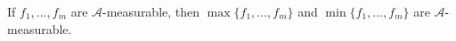 If $f_1, \ldots, f_m$ are $\mathcal{A}$-measurable, then $\max\{f_1, \ldots, f_m\}$ and $\min\{f_1, \ldots, f_m\}$ are $\mathcal{A}$-measurable.
